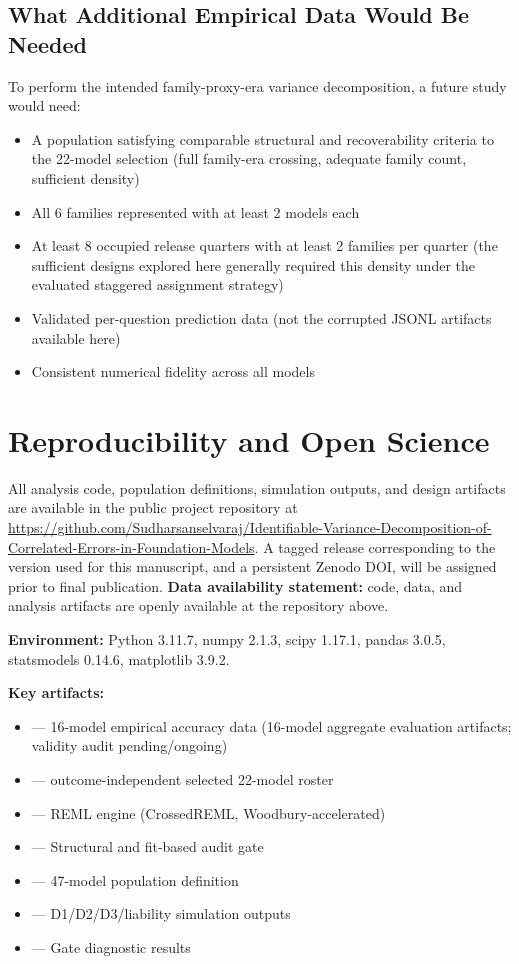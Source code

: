 \documentclass[11pt]{article}
\theoremstyle{definition}
\theoremstyle{plain}
\begin{document}
\subsection{What Additional Empirical Data Would Be Needed}
To perform the intended family-proxy-era variance decomposition, a future study would need:
\begin{itemize}
\item A population satisfying comparable structural and recoverability criteria to the 22-model selection (full family-era crossing, adequate family count, sufficient density)
\item All 6 families represented with at least 2 models each
\item At least 8 occupied release quarters with at least 2 families per quarter (the sufficient designs explored here generally required this density under the evaluated staggered assignment strategy)
\item Validated per-question prediction data (not the corrupted JSONL artifacts available here)
\item Consistent numerical fidelity across all models
\end{itemize}

\section{Reproducibility and Open Science}
\label{sec:repro}

All analysis code, population definitions, simulation outputs, and design artifacts are available in the public project repository at \url{https://github.com/Sudharsanselvaraj/Identifiable-Variance-Decomposition-of-Correlated-Errors-in-Foundation-Models}. A tagged release corresponding to the version used for this manuscript, and a persistent Zenodo DOI, will be assigned prior to final publication. \textbf{Data availability statement:} code, data, and analysis artifacts are openly available at the repository above.

\textbf{Environment:} Python 3.11.7, numpy 2.1.3, scipy 1.17.1, pandas 3.0.5, statsmodels 0.14.6, matplotlib 3.9.2.

\textbf{Key artifacts:}
\begin{itemize}
\item {} --- 16-model empirical accuracy data (16-model aggregate evaluation artifacts; validity audit pending/ongoing)
\item {} --- outcome-independent selected 22-model roster
\item {} --- REML engine (CrossedREML, Woodbury-accelerated)
\item {} --- Structural and fit-based audit gate
\item {} --- 47-model population definition
\item {} --- D1/D2/D3/liability simulation outputs
\item {} --- Gate diagnostic results
\end{itemize}
\end{document}
